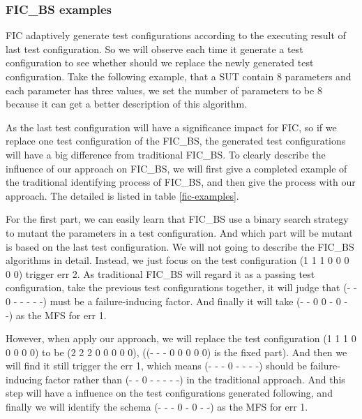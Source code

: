 \documentclass{sig-alternate}
\begin{document}
\subsubsection{FIC\_BS examples}

FIC adaptively generate test configurations according to the executing result of last test configuration. So we will observe each time it generate a test configuration to see whether should we replace the newly generated test configuration. Take the following example, that a SUT contain 8 parameters and each parameter has three values, we set the number of parameters to be 8 because it can get a better description of this algorithm.

As the last test configuration will have a significance impact for FIC, so if we replace one test configuration of the FIC\_BS, the generated test configurations will have a big difference from traditional FIC\_BS. To clearly describe the influence of our approach on FIC\_BS, we will first give a completed example of the traditional identifying process of FIC\_BS, and then give the process with our approach. The detailed is listed in table \ref{fic-examples}.

For the first part, we can easily learn that FIC\_BS use a binary search strategy to mutant the parameters in a test configuration. And which part will be mutant is based on the last test configuration. We will not going to describe the FIC\_BS algorithms in detail. Instead, we just focus on the test configuration (1 1 1 0 0 0 0 0) trigger err 2. As traditional FIC\_BS will regard it as a passing test configuration, take the previous test configurations together, it will judge that (- - 0 - - - - -) must be a failure-inducing factor. And finally it will take (- - 0 0 - 0 - -) as the MFS for err 1.

However, when apply our approach, we will replace the test configuration (1 1 1 0 0 0 0 0) to be (2 2 2 0 0 0 0 0), ((- - - 0 0 0 0 0) is the fixed part). And then we will find it still trigger the err 1, which means (- - - 0 - - - -) should be failure-inducing factor rather than (- - 0 - - - - -) in the traditional approach. And this step will have a influence on the test configurations generated following, and finally we will identify the schema (- - - 0 - 0 - -) as the MFS for err 1.
\end{document}
